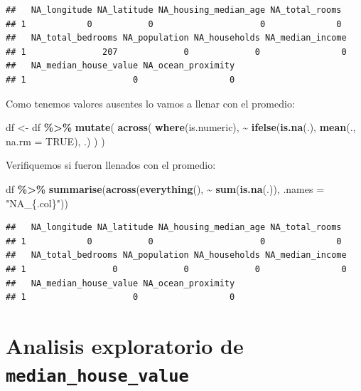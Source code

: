 \documentclass[
]{book}
\newenvironment{Shaded}{\begin{snugshade}}{\end{snugshade}}
\newcommand{\AttributeTok}[1]{\textcolor[rgb]{0.13,0.29,0.53}{#1}}
\newcommand{\ConstantTok}[1]{\textcolor[rgb]{0.56,0.35,0.01}{#1}}
\newcommand{\FunctionTok}[1]{\textcolor[rgb]{0.13,0.29,0.53}{\textbf{#1}}}
\newcommand{\NormalTok}[1]{#1}
\newcommand{\OtherTok}[1]{\textcolor[rgb]{0.56,0.35,0.01}{#1}}
\newcommand{\SpecialCharTok}[1]{\textcolor[rgb]{0.81,0.36,0.00}{\textbf{#1}}}
\newcommand{\StringTok}[1]{\textcolor[rgb]{0.31,0.60,0.02}{#1}}
\begin{document}
\begin{verbatim}
##   NA_longitude NA_latitude NA_housing_median_age NA_total_rooms
## 1            0           0                     0              0
##   NA_total_bedrooms NA_population NA_households NA_median_income
## 1               207             0             0                0
##   NA_median_house_value NA_ocean_proximity
## 1                     0                  0
\end{verbatim}

Como tenemos valores ausentes lo vamos a llenar con el promedio:

\begin{Shaded}
\begin{Highlighting}[]
\NormalTok{df }\OtherTok{\textless{}{-}}\NormalTok{ df }\SpecialCharTok{\%\textgreater{}\%}
  \FunctionTok{mutate}\NormalTok{(}
    \FunctionTok{across}\NormalTok{(}
      \FunctionTok{where}\NormalTok{(is.numeric),}
      \SpecialCharTok{\textasciitilde{}} \FunctionTok{ifelse}\NormalTok{(}\FunctionTok{is.na}\NormalTok{(.), }\FunctionTok{mean}\NormalTok{(., }\AttributeTok{na.rm =} \ConstantTok{TRUE}\NormalTok{), .)}
\NormalTok{    )}
\NormalTok{  )}
\end{Highlighting}
\end{Shaded}

Verifiquemos si fueron llenados con el promedio:

\begin{Shaded}
\begin{Highlighting}[]
\NormalTok{df }\SpecialCharTok{\%\textgreater{}\%}
  \FunctionTok{summarise}\NormalTok{(}\FunctionTok{across}\NormalTok{(}\FunctionTok{everything}\NormalTok{(), }\SpecialCharTok{\textasciitilde{}} \FunctionTok{sum}\NormalTok{(}\FunctionTok{is.na}\NormalTok{(.)), }\AttributeTok{.names =} \StringTok{"NA\_\{.col\}"}\NormalTok{))}
\end{Highlighting}
\end{Shaded}

\begin{verbatim}
##   NA_longitude NA_latitude NA_housing_median_age NA_total_rooms
## 1            0           0                     0              0
##   NA_total_bedrooms NA_population NA_households NA_median_income
## 1                 0             0             0                0
##   NA_median_house_value NA_ocean_proximity
## 1                     0                  0
\end{verbatim}

\section{\texorpdfstring{Analisis exploratorio de \texttt{median\_house\_value}}{Analisis exploratorio de median\_house\_value}}\label{analisis-exploratorio-de-median_house_value}
\end{document}
